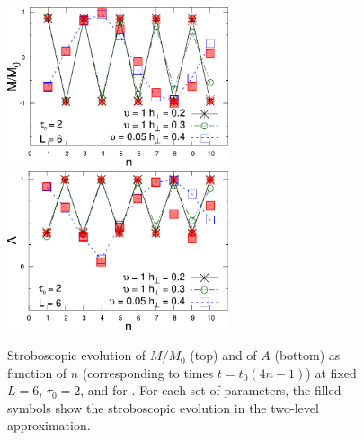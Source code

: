 \begin{figure}[t]
\centering
\includegraphics[width=6.5cm]{imm/strobM.pdf}\\
\includegraphics[width=6.5cm]{imm/strobA.pdf}
\caption{Stroboscopic evolution of $M/M_0$ (top) and of $A$ (bottom) as function of  $n$ (corresponding to times $t=t_0(4n-1)$) at fixed $L=6$, $\tau_0=2$, and for . For each set of parameters, the filled symbols show the stroboscopic evolution in the two-level approximation.}\label{fig:strobo}
\end{figure}

